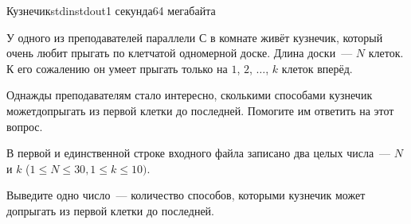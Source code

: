 \begin{problem}{Кузнечик}{stdin}{stdout}{1 секунда}{64 мегабайта}

У одного из преподавателей параллели С в комнате живёт кузнечик, который очень любит прыгать по клетчатой одномерной доске. Длина доски~--- $N$ клеток. К его сожалению он умеет прыгать только на $1$, $2$, $\ldots$, $k$ клеток вперёд. 

Однажды преподавателям стало интересно, сколькими способами кузнечик можетдопрыгать из первой клетки до последней. Помогите им ответить на этот вопрос.


\InputFile
В первой и единственной строке входного файла записано два целых числа~--- $N$ и $k$ ($1 \le N \le 30, 1 \le k \le 10)$.


\OutputFile
Выведите одно число~--- количество способов, которыми кузнечик может допрыгать из первой клетки до последней.

\Examples

\begin{example}
%
\end{example}

\end{problem}
